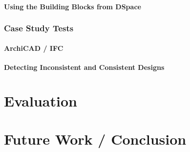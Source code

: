 \documentclass[12pt]{ucthesis}
\begin{document}
\subsubsection{Using the Building Blocks from DSpace}

\subsection{Case Study Tests}

\subsubsection{ArchiCAD / IFC}

\subsubsection{Detecting Inconsistent and Consistent Designs}

\chapter{Evaluation}


\chapter{Future Work / Conclusion}




\clearpage


%

%
%

\end{document}
